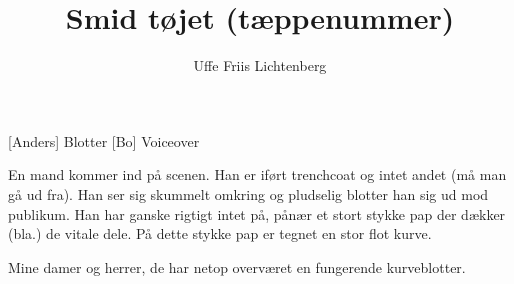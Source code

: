 \documentclass[a4paper,11pt]{article}
\title{Smid tøjet (tæppenummer)}
\author{Uffe Friis Lichtenberg}
\begin{document}
\maketitle

\begin{roles}
[Anders] Blotter
[Bo] Voiceover
\end{roles}

\begin{props}
\end{props}

\begin{sketch}

\scene En mand kommer ind på scenen. Han er iført trenchcoat og intet andet (må man gå ud fra). Han ser sig skummelt omkring og pludselig blotter han sig ud mod publikum. Han har ganske rigtigt intet på, pånær et stort stykke pap der dækker (bla.) de vitale dele. På dette stykke pap er tegnet en stor flot kurve.

 Mine damer og herrer, de har netop overværet en fungerende kurveblotter.

\end{sketch}
\end{document}
